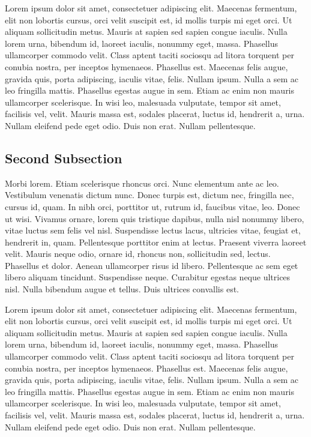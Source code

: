 Lorem ipsum dolor sit amet, consectetuer adipiscing elit. Maecenas fermentum, elit non lobortis cursus, orci velit suscipit est, id mollis turpis mi eget orci. Ut aliquam sollicitudin metus. Mauris at sapien sed sapien congue iaculis. Nulla lorem urna, bibendum id, laoreet iaculis, nonummy eget, massa. Phasellus ullamcorper commodo velit. Class aptent taciti sociosqu ad litora torquent per conubia nostra, per inceptos hymenaeos. Phasellus est. Maecenas felis augue, gravida quis, porta adipiscing, iaculis vitae, felis. Nullam ipsum. Nulla a sem ac leo fringilla mattis. Phasellus egestas augue in sem. Etiam ac enim non mauris ullamcorper scelerisque. In wisi leo, malesuada vulputate, tempor sit amet, facilisis vel, velit. Mauris massa est, sodales placerat, luctus id, hendrerit a, urna. Nullam eleifend pede eget odio. Duis non erat. Nullam pellentesque.


\subsection{Second Subsection}

Morbi lorem. Etiam scelerisque rhoncus orci. Nunc elementum ante ac leo. Vestibulum venenatis dictum nunc. Donec turpis est, dictum nec, fringilla nec, cursus id, quam. In nibh orci, porttitor ut, rutrum id, faucibus vitae, leo. Donec ut wisi. Vivamus ornare, lorem quis tristique dapibus, nulla nisl nonummy libero, vitae luctus sem felis vel nisl. Suspendisse lectus lacus, ultricies vitae, feugiat et, hendrerit in, quam. Pellentesque porttitor enim at lectus. Praesent viverra laoreet velit. Mauris neque odio, ornare id, rhoncus non, sollicitudin sed, lectus. Phasellus et dolor. Aenean ullamcorper risus id libero. Pellentesque ac sem eget libero aliquam tincidunt. Suspendisse neque. Curabitur egestas neque ultrices nisl. Nulla bibendum augue et tellus. Duis ultrices convallis est.

Lorem ipsum dolor sit amet, consectetuer adipiscing elit. Maecenas fermentum, elit non lobortis cursus, orci velit suscipit est, id mollis turpis mi eget orci. Ut aliquam sollicitudin metus. Mauris at sapien sed sapien congue iaculis. Nulla lorem urna, bibendum id, laoreet iaculis, nonummy eget, massa. Phasellus ullamcorper commodo velit. Class aptent taciti sociosqu ad litora torquent per conubia nostra, per inceptos hymenaeos. Phasellus est. Maecenas felis augue, gravida quis, porta adipiscing, iaculis vitae, felis. Nullam ipsum. Nulla a sem ac leo fringilla mattis. Phasellus egestas augue in sem. Etiam ac enim non mauris ullamcorper scelerisque. In wisi leo, malesuada vulputate, tempor sit amet, facilisis vel, velit. Mauris massa est, sodales placerat, luctus id, hendrerit a, urna. Nullam eleifend pede eget odio. Duis non erat. Nullam pellentesque.

